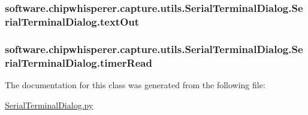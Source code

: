 \subsubsection[{text\+Out}]{\setlength{\rightskip}{0pt plus 5cm}software.\+chipwhisperer.\+capture.\+utils.\+Serial\+Terminal\+Dialog.\+Serial\+Terminal\+Dialog.\+text\+Out}\label{classsoftware_1_1chipwhisperer_1_1capture_1_1utils_1_1SerialTerminalDialog_1_1SerialTerminalDialog_a5e90a4524b680cfc7e6d53b878e5e15a}
\hypertarget{classsoftware_1_1chipwhisperer_1_1capture_1_1utils_1_1SerialTerminalDialog_1_1SerialTerminalDialog_a078a9a871e858dc75c8198c87a4bca3c}{}
\subsubsection[{timer\+Read}]{\setlength{\rightskip}{0pt plus 5cm}software.\+chipwhisperer.\+capture.\+utils.\+Serial\+Terminal\+Dialog.\+Serial\+Terminal\+Dialog.\+timer\+Read}\label{classsoftware_1_1chipwhisperer_1_1capture_1_1utils_1_1SerialTerminalDialog_1_1SerialTerminalDialog_a078a9a871e858dc75c8198c87a4bca3c}


The documentation for this class was generated from the following file\+:\begin{DoxyCompactItemize}
\item 
\hyperlink{SerialTerminalDialog_8py}{Serial\+Terminal\+Dialog.\+py}\end{DoxyCompactItemize}
